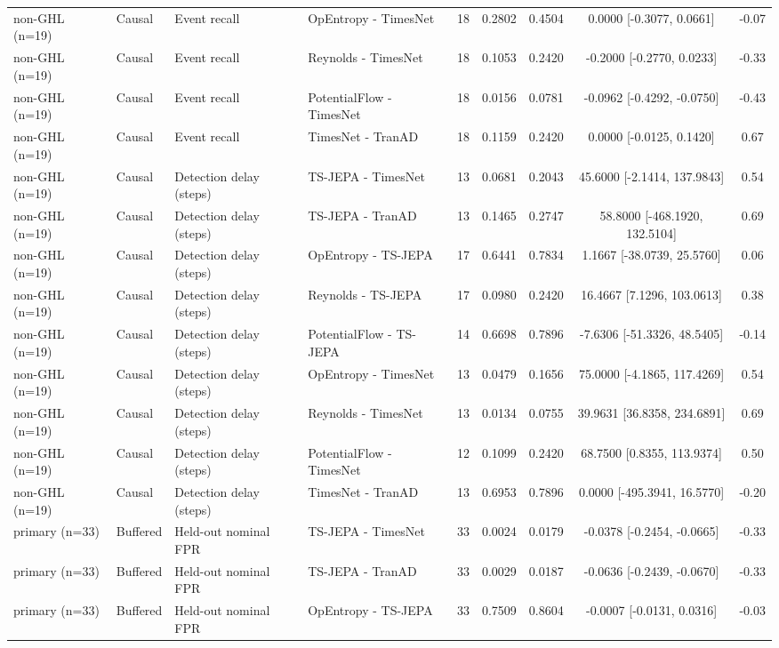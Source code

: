 \begin{table}[t]
\begin{tabular}{@{}llllccccc@{}}
non-GHL (n=19) & Causal & Event recall & OpEntropy - TimesNet & 18 & 0.2802 & 0.4504 & 0.0000 [-0.3077, 0.0661] & -0.07 \\
non-GHL (n=19) & Causal & Event recall & Reynolds - TimesNet & 18 & 0.1053 & 0.2420 & -0.2000 [-0.2770, 0.0233] & -0.33 \\
non-GHL (n=19) & Causal & Event recall & PotentialFlow - TimesNet & 18 & 0.0156 & 0.0781 & -0.0962 [-0.4292, -0.0750] & -0.43 \\
non-GHL (n=19) & Causal & Event recall & TimesNet - TranAD & 18 & 0.1159 & 0.2420 & 0.0000 [-0.0125, 0.1420] & 0.67 \\
non-GHL (n=19) & Causal & Detection delay (steps) & TS-JEPA - TimesNet & 13 & 0.0681 & 0.2043 & 45.6000 [-2.1414, 137.9843] & 0.54 \\
non-GHL (n=19) & Causal & Detection delay (steps) & TS-JEPA - TranAD & 13 & 0.1465 & 0.2747 & 58.8000 [-468.1920, 132.5104] & 0.69 \\
non-GHL (n=19) & Causal & Detection delay (steps) & OpEntropy - TS-JEPA & 17 & 0.6441 & 0.7834 & 1.1667 [-38.0739, 25.5760] & 0.06 \\
non-GHL (n=19) & Causal & Detection delay (steps) & Reynolds - TS-JEPA & 17 & 0.0980 & 0.2420 & 16.4667 [7.1296, 103.0613] & 0.38 \\
non-GHL (n=19) & Causal & Detection delay (steps) & PotentialFlow - TS-JEPA & 14 & 0.6698 & 0.7896 & -7.6306 [-51.3326, 48.5405] & -0.14 \\
non-GHL (n=19) & Causal & Detection delay (steps) & OpEntropy - TimesNet & 13 & 0.0479 & 0.1656 & 75.0000 [-4.1865, 117.4269] & 0.54 \\
non-GHL (n=19) & Causal & Detection delay (steps) & Reynolds - TimesNet & 13 & 0.0134 & 0.0755 & 39.9631 [36.8358, 234.6891] & 0.69 \\
non-GHL (n=19) & Causal & Detection delay (steps) & PotentialFlow - TimesNet & 12 & 0.1099 & 0.2420 & 68.7500 [0.8355, 113.9374] & 0.50 \\
non-GHL (n=19) & Causal & Detection delay (steps) & TimesNet - TranAD & 13 & 0.6953 & 0.7896 & 0.0000 [-495.3941, 16.5770] & -0.20 \\
primary (n=33) & Buffered & Held-out nominal FPR & TS-JEPA - TimesNet & 33 & 0.0024 & 0.0179 & -0.0378 [-0.2454, -0.0665] & -0.33 \\
primary (n=33) & Buffered & Held-out nominal FPR & TS-JEPA - TranAD & 33 & 0.0029 & 0.0187 & -0.0636 [-0.2439, -0.0670] & -0.33 \\
primary (n=33) & Buffered & Held-out nominal FPR & OpEntropy - TS-JEPA & 33 & 0.7509 & 0.8604 & -0.0007 [-0.0131, 0.0316] & -0.03 \\

\end{tabular}
\end{table}
